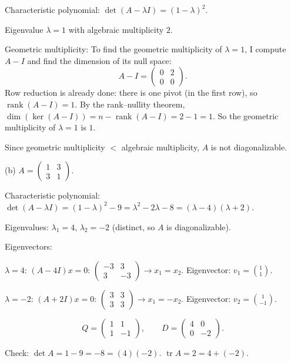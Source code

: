 \documentclass{article}
\begin{document}
\begin{mdframed}[linewidth=1pt]
\textnormal{Characteristic polynomial:}
$\det(A - \lambda I) = (1-\lambda)^2$.

Eigenvalue $\lambda = 1$ with algebraic multiplicity $2$.

Geometric multiplicity: To find the geometric multiplicity of $\lambda = 1$, I compute $A - I$ and find the dimension of its null space:
\[
A - I = \begin{pmatrix} 0 & 2 \\ 0 & 0 \end{pmatrix}.
\]
Row reduction is already done: there is one pivot (in the first row), so $\operatorname{rank}(A - I) = 1$. By the rank--nullity theorem, $\dim(\ker(A - I)) = n - \operatorname{rank}(A-I) = 2 - 1 = 1$. So the geometric multiplicity of $\lambda = 1$ is $1$.

Since geometric multiplicity $< $ algebraic multiplicity, $A$ is \textnormal{not diagonalizable}.
\end{mdframed}

\bigskip

\noindent\textnormal{(b)}
$A = \begin{pmatrix} 1 & 3 \\ 3 & 1 \end{pmatrix}$.

\begin{mdframed}[linewidth=1pt]
\textnormal{Characteristic polynomial:}
$\det(A - \lambda I) = (1-\lambda)^2 - 9 = \lambda^2 - 2\lambda - 8 = (\lambda - 4)(\lambda + 2)$.

Eigenvalues: $\lambda_1 = 4$, $\lambda_2 = -2$ (distinct, so $A$ is \textnormal{diagonalizable}).

\textnormal{Eigenvectors:}

$\lambda = 4$: $(A - 4I)x = 0$: $\begin{pmatrix} -3 & 3 \\ 3 & -3 \end{pmatrix} \to x_1 = x_2$. Eigenvector: $v_1 = \binom{1}{1}$.

$\lambda = -2$: $(A + 2I)x = 0$: $\begin{pmatrix} 3 & 3 \\ 3 & 3 \end{pmatrix} \to x_1 = -x_2$. Eigenvector: $v_2 = \binom{1}{-1}$.

\[
\boxed{Q = \begin{pmatrix} 1 & 1 \\ 1 & -1 \end{pmatrix}, \qquad D = \begin{pmatrix} 4 & 0 \\ 0 & -2 \end{pmatrix}.}
\]

\textnormal{Check:} $\det A = 1 - 9 = -8 = (4)(-2)$. $\operatorname{tr} A = 2 = 4 + (-2)$.\end{mdframed}
\end{document}
